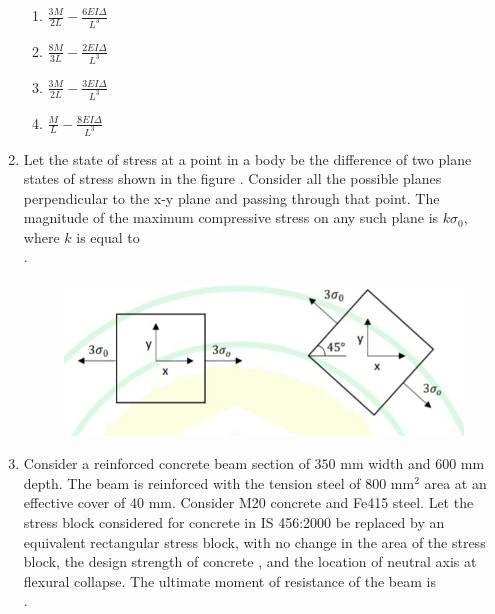 \documentclass[journal,12pt,onecolumn]{article}
\theoremstyle{remark}
\begin{document}
\begin{enumerate}
    \hfill{}
    \begin{enumerate}
        \item $\frac{3M}{2L} - \frac{6EI\Delta}{L^3}$
        \item $\frac{8M}{3L} - \frac{2EI\Delta}{L^3}$
        \item $\frac{3M}{2L} - \frac{3EI\Delta}{L^3}$
        \item $\frac{M}{L} - \frac{8EI\Delta}{L^3}$
    \end{enumerate}

    \item Let the state of stress at a point in a body be the difference of two plane states of stress shown in the figure . Consider all the possible planes perpendicular to the x-y plane and passing through that point. The magnitude of the maximum compressive stress on any such plane is $k\sigma_0$, where $k$ is equal to \underline{\hspace{2cm}} \\ .
    \begin{figure}[H]
        \centering
        \includegraphics[width=0.7\columnwidth]{figs/2q-39.jpg}
        \caption{}
        \label{fig:q39}
    \end{figure}
    
    \hfill{}
    \begin{enumerate}
    \end{enumerate}

    \item Consider a reinforced concrete beam section of $350$ mm width and $600$ mm depth. The beam is reinforced with the tension steel of $800$ mm$^2$ area at an effective cover of $40$ mm. Consider M20 concrete and Fe415 steel. Let the stress block considered for concrete in IS 456:2000 be replaced by an equivalent rectangular stress block, with no change in  the area of the stress block,  the design strength of concrete , and  the location of neutral axis at flexural collapse. The ultimate moment of resistance of the beam  is \underline{\hspace{2cm}} \\ .


\end{enumerate}
\end{document}
